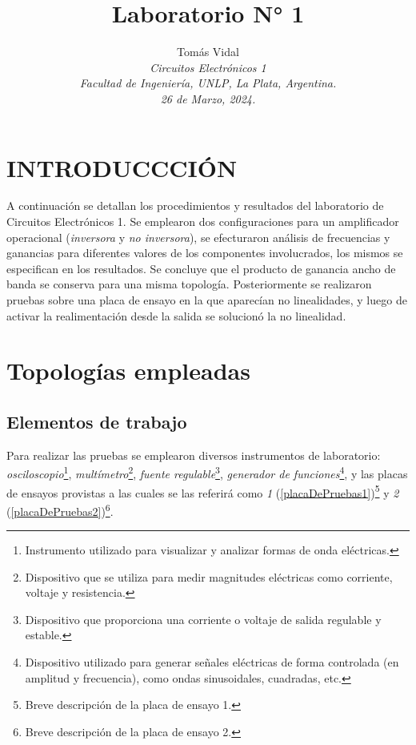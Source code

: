 \documentclass[letterpaper, 10 pt, conference]{ieeeconf}  %
\title{\LARGE \bf Laboratorio N° 1}
\author{
  Tom\'as Vidal\\
  {\it Circuitos Electrónicos 1}\\
  {\it Facultad de Ingenier\'ia, UNLP, La Plata, Argentina.}\\
  {\it 26 de Marzo, 2024.}
}                                            %
\begin{document}
\maketitle
\thispagestyle{empty}
\pagestyle{empty}

\section{INTRODUCCCI\'ON}
A continuación se detallan los procedimientos y resultados del laboratorio de Circuitos Electrónicos 1. Se emplearon dos configuraciones para un amplificador operacional (\textit{inversora} y \textit{no inversora}), se efecturaron análisis de frecuencias y ganancias para diferentes valores de los componentes involucrados, los mismos se especifican en los resultados. Se concluye que el producto de ganancia ancho de banda se conserva para una misma topología. Posteriormente se realizaron pruebas sobre una placa de ensayo en la que aparecían no linealidades, y luego de activar la realimentación desde la salida se solucionó la no linealidad.

\section{Topologías empleadas}
\subsection{Elementos de trabajo}
Para realizar las pruebas se emplearon diversos instrumentos de laboratorio: \textit{osciloscopio}\footnote{Instrumento utilizado para visualizar y analizar formas de onda eléctricas.}, \textit{multímetro}\footnote{Dispositivo que se utiliza para medir magnitudes eléctricas como corriente, voltaje y resistencia.}, \textit{fuente regulable}\footnote{Dispositivo que proporciona una corriente o voltaje de salida regulable y estable.}, \textit{generador de funciones}\footnote{Dispositivo utilizado para generar señales eléctricas de forma controlada (en amplitud y frecuencia), como ondas sinusoidales, cuadradas, etc. }, y las placas de ensayos provistas a las cuales se las referirá como \textit{1} (\ref{placaDePruebas1})\footnote{Breve descripción de la placa de ensayo 1.} y \textit{2} (\ref{placaDePruebas2})\footnote{Breve descripción de la placa de ensayo 2.}. 
\end{document}
